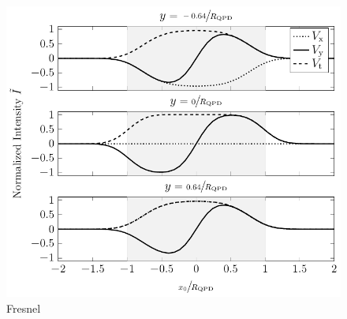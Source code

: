 \begin{figure}[htp]
  \centering
  \includegraphics[]{Plots/cache/voltages_over_x.pdf}
  \caption{Fresnel}
  \label{fig:Th-voltages_over_x}
\end{figure}

